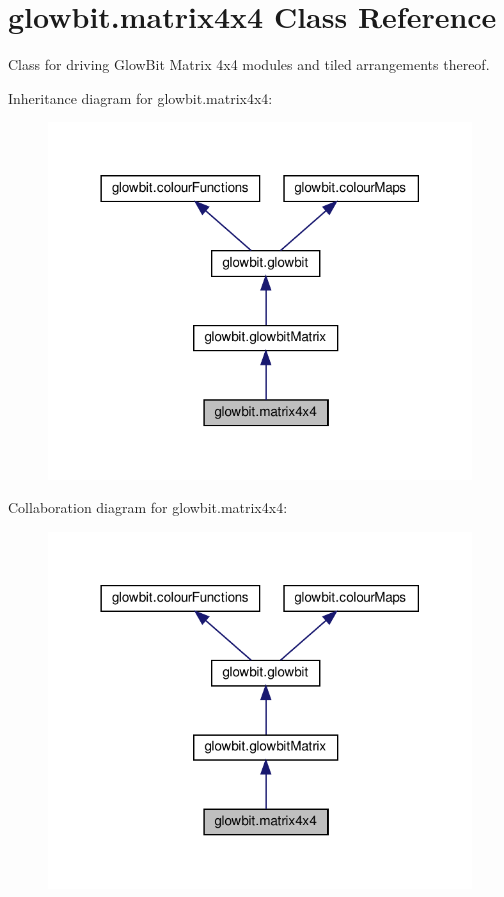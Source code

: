 \hypertarget{classglowbit_1_1matrix4x4}{}\section{glowbit.\+matrix4x4 Class Reference}
\label{classglowbit_1_1matrix4x4}


Class for driving Glow\+Bit Matrix 4x4 modules and tiled arrangements thereof.  




Inheritance diagram for glowbit.\+matrix4x4\+:\nopagebreak
\begin{figure}[H]
\begin{center}
\leavevmode
\includegraphics[width=318pt]{classglowbit_1_1matrix4x4__inherit__graph}
\end{center}
\end{figure}


Collaboration diagram for glowbit.\+matrix4x4\+:\nopagebreak
\begin{figure}[H]
\begin{center}
\leavevmode
\includegraphics[width=318pt]{classglowbit_1_1matrix4x4__coll__graph}
\end{center}
\end{figure}
